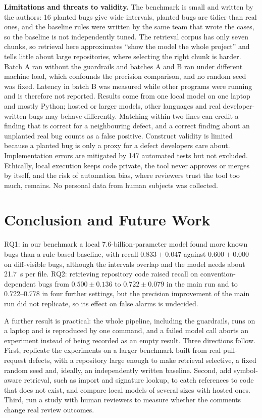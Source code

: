 \documentclass[12pt,onecolumn,draftclsnofoot]{IEEEtran}
\begin{document}
\textbf{Limitations and threats to validity.} The benchmark is small and written by the authors: 16 planted bugs give wide intervals, planted bugs are tidier than real ones, and the baseline rules were written by the same team that wrote the cases, so the baseline is not independently tuned. The retrieval corpus has only seven chunks, so retrieval here approximates ``show the model the whole project'' and tells little about large repositories, where selecting the right chunk is harder. Batch A ran without the guardrails and batches A and B ran under different machine load, which confounds the precision comparison, and no random seed was fixed. Latency in batch B was measured while other programs were running and is therefore not reported. Results come from one local model on one laptop and mostly Python; hosted or larger models, other languages and real developer-written bugs may behave differently. Matching within two lines can credit a finding that is correct for a neighbouring defect, and a correct finding about an unplanted real bug counts as a false positive. Construct validity is limited because a planted bug is only a proxy for a defect developers care about. Implementation errors are mitigated by 147 automated tests but not excluded. Ethically, local execution keeps code private, the tool never approves or merges by itself, and the risk of automation bias, where reviewers trust the tool too much, remains. No personal data from human subjects was collected.

\section{Conclusion and Future Work}\label{sec:conclusion}
RQ1: in our benchmark a local 7.6-billion-parameter model found more known bugs than a rule-based baseline, with recall $0.833\pm0.047$ against $0.600\pm0.000$ on diff-visible bugs, although the intervals overlap and the model needs about 21.7~s per file. RQ2: retrieving repository code raised recall on convention-dependent bugs from $0.500\pm0.136$ to $0.722\pm0.079$ in the main run and to 0.722--0.778 in four further settings, but the precision improvement of the main run did not replicate, so its effect on false alarms is undecided.

A further result is practical: the whole pipeline, including the guardrails, runs on a laptop and is reproduced by one command, and a failed model call aborts an experiment instead of being recorded as an empty result. Three directions follow. First, replicate the experiments on a larger benchmark built from real pull-request defects, with a repository large enough to make retrieval selective, a fixed random seed and, ideally, an independently written baseline. Second, add symbol-aware retrieval, such as import and signature lookup, to catch references to code that does not exist, and compare local models of several sizes with hosted ones. Third, run a study with human reviewers to measure whether the comments change real review outcomes.
\end{document}

